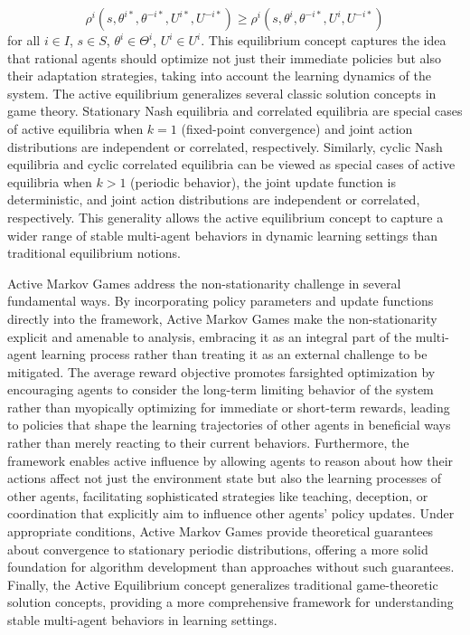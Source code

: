 \documentclass[a4paper,12pt]{report}
\begin{document}
\begin{equation}
    \rho^i(s, \theta^{i*}, \theta^{-i*}, U^{i*}, U^{-i*}) \geq \rho^i(s, \theta^i, \theta^{-i*}, U^i, U^{-i*})
\end{equation}
for all $i \in I$, $s \in S$, $\theta^i \in \Theta^i$, $U^i \in U^i$. This equilibrium concept captures the idea that rational agents should optimize not just their immediate policies but also their adaptation strategies, taking into account the learning dynamics of the system. The active equilibrium generalizes several classic solution concepts in game theory. Stationary Nash equilibria and correlated equilibria are special cases of active equilibria when $k = 1$ (fixed-point convergence) and joint action distributions are independent or correlated, respectively. Similarly, cyclic Nash equilibria and cyclic correlated equilibria can be viewed as special cases of active equilibria when $k > 1$ (periodic behavior), the joint update function is deterministic, and joint action distributions are independent or correlated, respectively. This generality allows the active equilibrium concept to capture a wider range of stable multi-agent behaviors in dynamic learning settings than traditional equilibrium notions.


Active Markov Games address the non-stationarity challenge in several fundamental ways. By incorporating policy parameters and update functions directly into the framework, Active Markov Games make the non-stationarity explicit and amenable to analysis, embracing it as an integral part of the multi-agent learning process rather than treating it as an external challenge to be mitigated. The average reward objective promotes farsighted optimization by encouraging agents to consider the long-term limiting behavior of the system rather than myopically optimizing for immediate or short-term rewards, leading to policies that shape the learning trajectories of other agents in beneficial ways rather than merely reacting to their current behaviors. Furthermore, the framework enables active influence by allowing agents to reason about how their actions affect not just the environment state but also the learning processes of other agents, facilitating sophisticated strategies like teaching, deception, or coordination that explicitly aim to influence other agents' policy updates. Under appropriate conditions, Active Markov Games provide theoretical guarantees about convergence to stationary periodic distributions, offering a more solid foundation for algorithm development than approaches without such guarantees. Finally, the Active Equilibrium concept generalizes traditional game-theoretic solution concepts, providing a more comprehensive framework for understanding stable multi-agent behaviors in learning settings.
\end{document}

